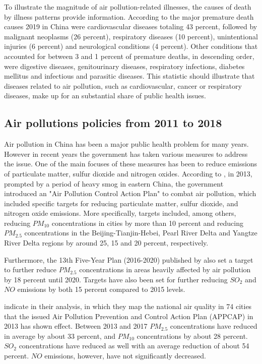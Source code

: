 \documentclass[
]{article}
\begin{document}
	To illustrate the magnitude of air pollution-related illnesses, the causes of death by illness patterns provide information. According to \cite{who_nodate} the major premature death causes 2019 in China were cardiovascular diseases totaling 43 percent, followed by malignant neoplasms (26 percent), respiratory diseases (10 percent), unintentional injuries (6 percent) and neurological conditions (4 percent). Other conditions that accounted for between 3 and 1 percent of premature deaths, in descending order, were digestive diseases, genitourinary diseases, respiratory infections, diabetes mellitus and infectious and parasitic diseases. This statistic should illustrate that diseases related to air pollution, such as cardiovascular, cancer or respiratory diseases, make up for an substantial share of public health issues. \\


	\subsection{Air pollutions policies from 2011 to 2018}

	Air pollution in China has been a major public health problem for many years. However in recent years the government has taken various measures to address the issue. One of the main focuses of these measures has been to reduce emissions of particulate matter, sulfur dioxide and nitrogen oxides.
	According to \cite{CHINA2013}, in 2013, prompted by a period of heavy smog in eastern China, the government introduced an "Air Pollution Control Action Plan" to combat air pollution, which included specific targets for reducing particulate matter, sulfur dioxide, and nitrogen oxide emissions. More specifically, targets included, among others, reducing $PM_{10}$ concentrations in cities by more than 10 percent and reducing $PM_{2.5}$ concentrations in the Beijing-Tianjin-Hebei, Pearl River Delta and Yangtze River Delta regions by  around 25, 15 and 20 percent, respectively.

	Furthermore, the 13th Five-Year Plan (2016-2020) published by \cite{CHINA2016} also set a target to further reduce $PM_{2.5}$ concentrations in areas heavily affected by air pollution by 18 percent until 2020. Targets have also been set for further reducing $SO_2$ and $NO$ emissions by both 15 percent compared to 2015 levels.

	\cite{HUANG2018e313} indicate in their analysis, in which they map the national air quality in 74 cities that the issued Air Pollution Prevention and Control Action Plan (APPCAP) in 2013 has shown effect. Between 2013 and 2017 $PM_{2.5}$ concentrations have reduced in average by about 33 percent, and $PM_{10}$ concentrations by about 28 percent. $SO_2$ concentrations have reduced as well with an average reduction of about 54 percent. $NO$ emissions, however, have not significantly decreased.
\end{document}

